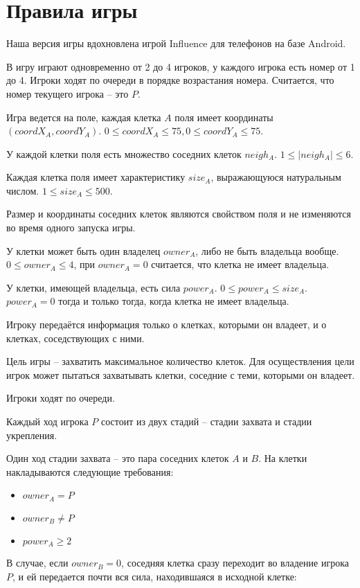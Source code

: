 \documentclass[12pt, a4paper]{article}
\begin{document}
{\section{Правила игры}}
Наша версия игры вдохновлена игрой Influence для телефонов на базе Android.

В игру играют одновременно от 2 до 4 игроков, у каждого игрока есть номер от 1 до 4. Игроки ходят по очереди в порядке возрастания номера. Считается, что номер текущего игрока -- это $P$.

Игра ведется на поле, каждая клетка $A$ поля имеет координаты $(coordX_A, coordY_A)$. $0 \le coordX_A \le 75, 0 \le coordY_A \le 75$.

У каждой клетки поля есть множество соседних клеток ${neigh_A}$. $1 \le |{neigh_A}| \le 6$.

Каждая клетка поля имеет характеристику $size_A$, выражающуюся натуральным числом. $1 \le size_A \le 500$.

Размер и координаты соседних клеток являются свойством поля и не изменяются во время одного запуска игры.

У клетки может быть один владелец $owner_A$, либо не быть владельца вообще. $0 \le owner_A \le 4$, при $owner_A = 0$ считается, что клетка не имеет владельца.

У клетки, имеющей владельца, есть сила $power_A$. $0 \le power_A \le size_A$. $power_A = 0$ тогда и только тогда, когда клетка не имеет владельца.

Игроку передаётся информация только о клетках, которыми он владеет, и о клетках, соседствующих с ними.

Цель игры -- захватить максимальное количество клеток.
Для осуществления цели игрок может пытаться захватывать клетки, соседние с теми, которыми он владеет.

Игроки ходят по очереди.

Каждый ход игрока $P$ состоит из двух стадий -- стадии захвата и стадии укрепления.

Один ход стадии захвата -- это пара соседних клеток $A$ и $B$. На клетки накладываются следующие требования:

\begin{itemize}
\item $owner_A = P$
\item $owner_B \neq P$
\item $power_A \ge 2$
\end{itemize}

В случае, если $owner_B = 0$, соседняя клетка сразу переходит во владение игрока $P$, и ей передается почти вся сила, находившаяся в исходной клетке:
\end{document}
